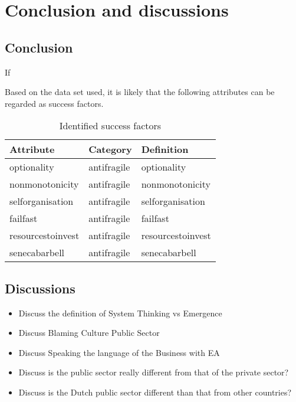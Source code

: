 \chapter{Conclusion and discussions}
\label{ch:conclusionanddiscussions}






\section{Conclusion}
\label{sec:conclusion}
If 

Based on the data set used, it is likely that the following attributes can be regarded as success factors.

\begin{table}[H]
	\begin{center}
			\begin{tabular}{p{}p{}p{}}
				\textbf{Attribute} & \textbf{Category} & \textbf{Definition} \\%
				\midrule%
				\Gls{optionality} & \Gls{antifragile} & \Glsdesc*{optionality} \\%
				\Gls{nonmonotonicity} & \Gls{antifragile} & \Glsdesc*{nonmonotonicity} \\%
				\Gls{selforganisation} & \Gls{antifragile} & \Glsdesc*{selforganisation} \\%
				\Gls{failfast} & \Gls{antifragile} & \Glsdesc*{failfast} \\%
				\Gls{resourcestoinvest} & \Gls{antifragile} & \Glsdesc*{resourcestoinvest} \\%
				\Gls{senecabarbell} & \Gls{antifragile} & \Glsdesc*{senecabarbell} \\%
				\bottomrule%
			\end{tabular}
		\caption{Identified success factors}
	\end{center}
\end{table}

\section{Discussions}
\label{sec:discussions}

\begin{itemize}
	\item{Discuss the definition of System Thinking vs Emergence}
	\item{Discuss Blaming Culture Public Sector}
	\item{Discuss Speaking the language of the Business with EA}
	\item{Discuss is the public sector really different from that of the private sector?}
	\item{Discuss is the Dutch public sector different than that from other countries?}
\end{itemize}

